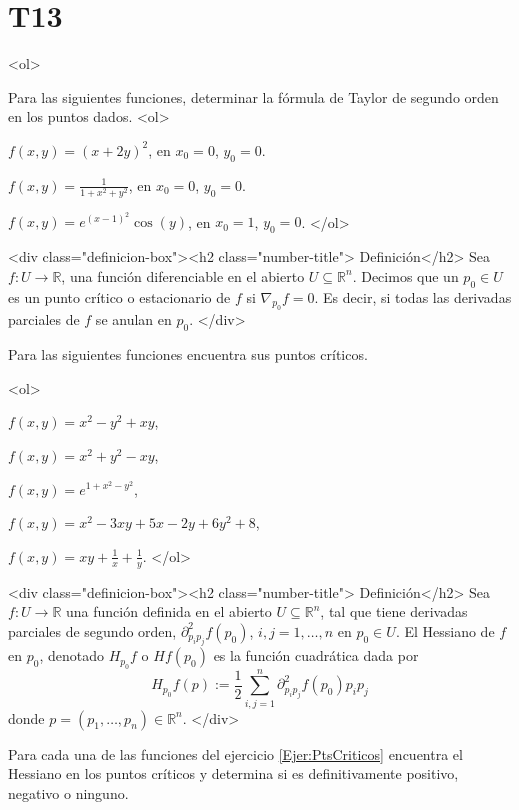 \documentclass{article}
\theoremstyle{definition}
\begin{document}
  \section*{T13 }
  <ol>
  \item Para las siguientes funciones, determinar la fórmula
    de Taylor de segundo orden en los puntos dados.
    <ol>
    \item $f(x,y)=(x+2y)^2$, en $x_0=0$, $y_0=0$.
    \item $f(x,y)=\frac{1}{1+x^2+y^2}$, en $x_0=0$, $y_0=0$.
    \item $f(x,y)=e^{(x-1)^2}\cos(y)$, en  $x_0=1$, $y_0=0$.
    </ol>

    <div class="definicion-box"><h2 class="number-title">  Definición</h2>
      Sea $f:U  \to \mathbb{R}$,
      una función diferenciable en el abierto $U\subseteq \mathbb{R}^n$.
      Decimos
      que un $p_0\in U$ es un punto crítico
      o estacionario de $f$ si $\nabla_{p_0}f=0$. Es decir, si todas
      las derivadas parciales de $f$ se anulan en $p_0$.
    </div>
    
    
  \item\label{Ejer:PtsCriticos}
    Para las siguientes funciones  encuentra sus puntos críticos.
  
 
    <ol>
    \item $f(x,y)=x^2-y^2+xy$,
    \item $f(x,y)=x^2+y^2-xy$,
    \item $f(x,y)=e^{1+x^2-y^2}$,
    \item $f(x,y)=x^2-3xy+5x-2y+6y^2+8$,
    \item $f(x,y)=xy+\frac{1}{x}+\frac{1}{y}$.
    </ol>
    

    <div class="definicion-box"><h2 class="number-title">  Definición</h2>
      Sea $f:U \to \mathbb{R}$ una función definida en el
      abierto $U\subseteq \mathbb{R}^n$, tal que tiene derivadas
      parciales de segundo orden, $\partial^2_{p_i p_j}f(p_0)$, $i,j=1,\dots, n$
      en  $p_0\in U$. El Hessiano de $f$ en $p_0$, denotado $H_{p_0}f$
      o $Hf(p_0)$ es la función cuadrática dada por
      $$
      H_{p_0}f(p):=\frac{1}{2}\sum_{i,j=1}^n
      \partial^2_{p_i p_j}f(p_0)p_ip_j
      $$
      donde $p=(p_1,\dots, p_n)\in \mathbb{R}^n$.
      </div>
    
  \item Para cada una de las funciones del ejercicio  \ref{Ejer:PtsCriticos}
    encuentra el Hessiano en los puntos críticos y determina si es
    definitivamente positivo, negativo o ninguno.
\end{document}
